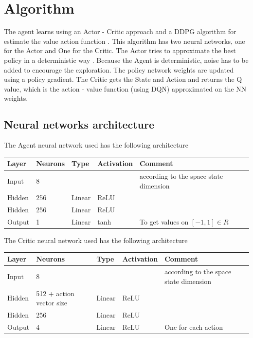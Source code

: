 \documentclass{article}
\begin{document}
\section{Algorithm}
The agent learns using an Actor - Critic \cite{ddpg} approach and a DDPG algorithm for estimate the value action function .\newline
This algorithm has two neural networks, one for the Actor and One for the Critic. 
The Actor tries to approximate the best policy in a deterministic way \newline.
Because the Agent is deterministic, noise has to be added to encourage the exploration.\newline
The policy network weights are updated using a policy gradient.\newline
The Critic gets the State and Action and returns the Q value, which is the action - value function (using DQN) approximated on the NN weights.\newline
\subsection{Neural networks architecture}
The Agent neural network used has the following architecture
\begin{table}[!htbp]
\center
\begin{tabular}{l|l|l|l|l}
Layer         & Neurons   & Type & Activation & Comment  \\
\hline
Input  &  8 &	&	& according to the space state dimension\\
Hidden & 256 &	Linear &	ReLU &\\	
Hidden & 256 &	Linear &	ReLU &\\ 	
Output &   1 &	Linear &	tanh & To get values on $[-1,1] \in R$ 
\end{tabular}
\end{table}

The Critic neural network used has the following architecture
\begin{table}[!htbp]
\center
\begin{tabular}{l|l|l|l|l}
Layer         & Neurons   & Type & Activation & Comment  \\
\hline
Input  &  8 &	&	& according to the space state dimension\\
Hidden &  512 + action vector size &	Linear &	ReLU &\\	
Hidden &  256 &	Linear &	ReLU &\\ 	
Output &   4 &	Linear &	ReLU & One for each action
\end{tabular}
\end{table}
\end{document}
